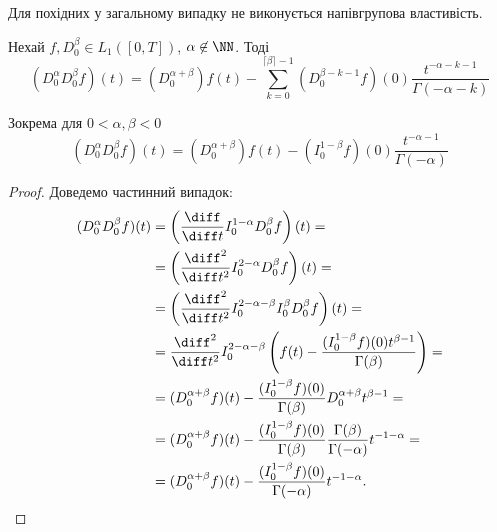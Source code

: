 \begin{proposition}
    Для похідних у загальному випадку не виконується напівгрупова властивість.
\end{proposition}
\begin{theorem}
    Нехай $f, D_0^\beta \in L_1([0, T])$, $\alpha \not\in \NN$. Тоді
    \begin{equation}
        (D_0^\alpha D_0^\beta f)(t) = (D_0^{\alpha + \beta}) f(t) - \sum_{k = 0}^{\lceil \beta \rceil - 1} (D_0^{\beta - k - 1} f)(0) \frac{t^{-\alpha - k - 1}}{\Gamma(-\alpha - k)}
    \end{equation}
\end{theorem}
\begin{example}
    Зокрема для $0 < \alpha, \beta < 0$
    \begin{equation}
        (D_0^\alpha D_0^\beta f)(t) = (D_0^{\alpha + \beta}) f(t) - (I_0^{1 - \beta} f)(0) \frac{t^{-\alpha - 1}}{\Gamma(-\alpha)}
    \end{equation}
\end{example}
\begin{proof}
    Доведемо частинний випадок:
    \begin{equation}
        \begin{aligned}
            (D_0^\alpha D_0^\beta f)(t)
            &= \left( \frac{\diff}{\diff t} I_0^{1 - \alpha} D_0^\beta f \right)(t) = \\
            &= \left( \frac{\diff^2}{\diff t^2} I_0^{2 - \alpha} D_0^\beta f \right)(t) = \\
            &= \left( \frac{\diff^2}{\diff t^2} I_0^{2 - \alpha - \beta} I_0^\beta D_0^\beta f \right)(t) = \\
            &= \frac{\diff^2}{\diff t^2} I_0^{2 - \alpha - \beta} \left( f(t) - \frac{(I_0^{1-\beta} f)(0) t^{\beta - 1}}{\Gamma(\beta)} \right) = \\
            &= (D_0^{\alpha + \beta} f)(t) - \frac{(I_0^{1-\beta} f)(0)}{\Gamma(\beta)} D_0^{\alpha+\beta} t^{\beta-1} = \\
            &= (D_0^{\alpha + \beta} f)(t) - \frac{(I_0^{1-\beta} f)(0)}{\Gamma(\beta)} \frac{\Gamma(\beta)}{\Gamma(-\alpha)} t^{-1-\alpha} = \\
            &= (D_0^{\alpha + \beta} f)(t) - \frac{(I_0^{1-\beta} f)(0)}{\Gamma(-\alpha)} t^{-1-\alpha}.
        \end{aligned}
    \end{equation}
\end{proof}
